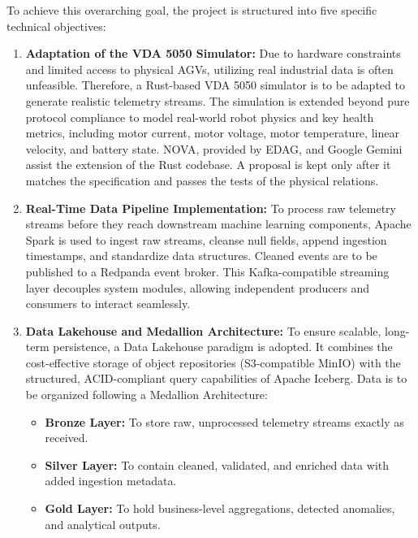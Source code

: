 To achieve this overarching goal, the project is structured into five specific technical objectives:
\begin{enumerate}
    \item \textbf{Adaptation of the VDA 5050\cite{vda5050standard} Simulator\cite{bostanciVda5050}:} 
    Due to hardware constraints and limited access to physical AGVs, utilizing real industrial data is often unfeasible. Therefore, a Rust-based VDA 5050 simulator is to be adapted to generate realistic telemetry streams. The simulation is extended beyond pure protocol compliance to model real-world robot physics and key health metrics, including motor current, motor voltage, motor temperature, linear velocity, and battery state. NOVA, provided by EDAG, and Google Gemini assist the extension of the Rust codebase. A proposal is kept only after it matches the specification and passes the tests of the physical relations.

    \item \textbf{Real-Time Data Pipeline Implementation:} 
    To process raw telemetry streams before they reach downstream machine learning components, Apache Spark\cite{apache_spark} is used to ingest raw streams, cleanse null fields, append ingestion timestamps, and standardize data structures. Cleaned events are to be published to a Redpanda\cite{redpanda} event broker. This Kafka-compatible streaming layer decouples system modules, allowing independent producers and consumers to interact seamlessly.

    \item \textbf{Data Lakehouse and Medallion Architecture\cite{dey2026lakehouse}:} 
    To ensure scalable, long-term persistence, a Data Lakehouse paradigm is adopted. It combines the cost-effective storage of object repositories (S3-compatible MinIO\cite{minio}) with the structured, ACID-compliant query capabilities of Apache Iceberg\cite{apache_iceberg}. Data is to be organized following a Medallion Architecture:
    \begin{itemize}
        \item \textbf{Bronze Layer:} To store raw, unprocessed telemetry streams exactly as received.
        \item \textbf{Silver Layer:} To contain cleaned, validated, and enriched data with added ingestion metadata.
        \item \textbf{Gold Layer:} To hold business-level aggregations, detected anomalies, and analytical outputs.
    \end{itemize}


\end{enumerate}
